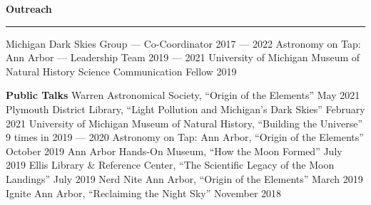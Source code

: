 \documentclass[10pt]{article}
\newcommand{\header}[1]{\vspace{2em}\par \textbf{\large #1}\strut\hrule\vspace{0em}}
\newcommand{\actionHeader}[2]{\textbf{#1 \hfill #2}}
\newcommand{\justifiedItemDate}[2]{\newline\null#1 \hfill #2}
\newcommand{\justifiedItemDateFirst}[2]{#1 \hfill #2}
\newcommand{\indentedItem}[1]{\newline\null\qquad #1}
\begin{document}








\header{Outreach}
\justifiedItemDateFirst{Michigan Dark Skies Group --- Co-Coordinator}{2017 --- 2022}
\justifiedItemDate{Astronomy on Tap: Ann Arbor --- Leadership Team}{2019 --- 2021}
\justifiedItemDate{University of Michigan Museum of Natural History Science Communication Fellow}{2019}

{\actionHeader{Public Talks}{}}
\justifiedItemDate{Warren Astronomical Society, ``Origin of the Elements''}{May 2021}
\justifiedItemDate{Plymouth District Library, ``Light Pollution and Michigan's Dark Skies''}{February 2021}
\justifiedItemDate{University of Michigan Museum of Natural History, ``Building the Universe''}{9 times in 2019 --- 2020}
\justifiedItemDate{Astronomy on Tap: Ann Arbor, ``Origin of the Elements''}{October 2019}
\justifiedItemDate{Ann Arbor Hands-On Museum, ``How the Moon Formed''}{July 2019}
\justifiedItemDate{Ellis Library \& Reference Center, ``The Scientific Legacy of the Moon Landings''}{July 2019}
\justifiedItemDate{Nerd Nite Ann Arbor, ``Origin of the Elements''}{March 2019}
\justifiedItemDate{Ignite Ann Arbor, ``Reclaiming the Night Sky''}{November 2018}
\end{document}
